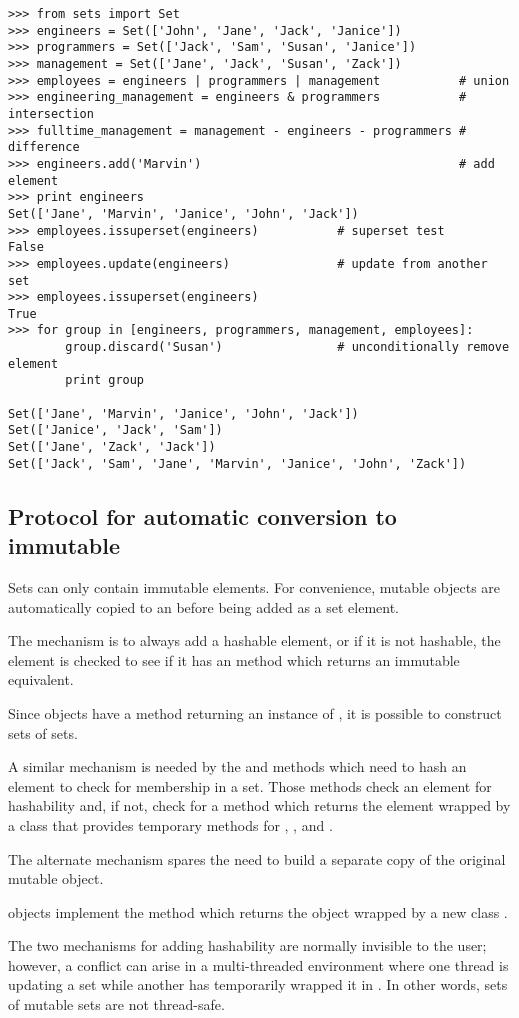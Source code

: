 \begin{verbatim}
>>> from sets import Set
>>> engineers = Set(['John', 'Jane', 'Jack', 'Janice'])
>>> programmers = Set(['Jack', 'Sam', 'Susan', 'Janice'])
>>> management = Set(['Jane', 'Jack', 'Susan', 'Zack'])
>>> employees = engineers | programmers | management           # union
>>> engineering_management = engineers & programmers           # intersection
>>> fulltime_management = management - engineers - programmers # difference
>>> engineers.add('Marvin')                                    # add element
>>> print engineers
Set(['Jane', 'Marvin', 'Janice', 'John', 'Jack'])
>>> employees.issuperset(engineers)           # superset test
False
>>> employees.update(engineers)               # update from another set
>>> employees.issuperset(engineers)
True
>>> for group in [engineers, programmers, management, employees]:
        group.discard('Susan')                # unconditionally remove element
        print group

Set(['Jane', 'Marvin', 'Janice', 'John', 'Jack'])
Set(['Janice', 'Jack', 'Sam'])
Set(['Jane', 'Zack', 'Jack'])
Set(['Jack', 'Sam', 'Jane', 'Marvin', 'Janice', 'John', 'Zack'])
\end{verbatim}


\subsection{Protocol for automatic conversion to immutable
            \label{immutable-transforms}}

Sets can only contain immutable elements.  For convenience, mutable
 objects are automatically copied to an 
before being added as a set element.

The mechanism is to always add a hashable element, or if it is not
hashable, the element is checked to see if it has an
 method which returns an immutable equivalent.

Since  objects have a  method
returning an instance of , it is possible to
construct sets of sets.

A similar mechanism is needed by the  and
 methods which need to hash an element to check
for membership in a set.  Those methods check an element for hashability
and, if not, check for a  method
which returns the element wrapped by a class that provides temporary
methods for , , and .

The alternate mechanism spares the need to build a separate copy of
the original mutable object.

 objects implement the 
method which returns the  object wrapped by a new class
.

The two mechanisms for adding hashability are normally invisible to the
user; however, a conflict can arise in a multi-threaded environment
where one thread is updating a set while another has temporarily wrapped it
in .  In other words, sets of mutable sets
are not thread-safe.
